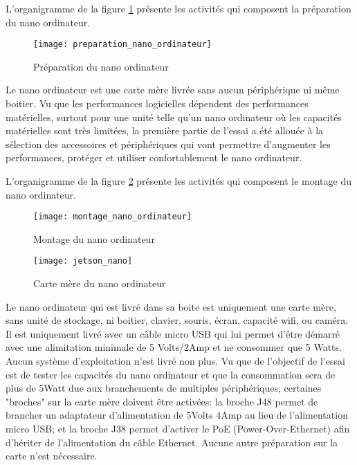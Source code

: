 ﻿\label{preparation_nano_ordinateur}
\par L'organigramme de la figure \ref{fig:preparation_nano_ordinateur} présente les activités qui composent la préparation du nano ordinateur. 
\begin{figure}[H]
    \centering
    \texttt{[image: preparation\_nano\_ordinateur]}
    \caption{Préparation du nano ordinateur}
    \label{fig:preparation_nano_ordinateur}
\end{figure}
\par Le nano ordinateur est une carte mère livrée sans aucun périphérique ni même boitier. Vu que les performances logicielles dépendent des performances matérielles, surtout pour une unité telle qu'un nano ordinateur où les capacités matérielles sont très limitées, la première partie de l'essai a été allouée à la sélection des accessoires et périphériques qui vont permettre d'augmenter les performances, protéger et utiliser confortablement le nano ordinateur. 
\label{montage_nano_ordinateur}
\par L'organigramme de la figure \ref{fig:montage_nano_ordinateur} présente les activités qui composent le montage du nano ordinateur. 
\begin{figure}[H]
    \centering
    \texttt{[image: montage\_nano\_ordinateur]}
    \caption{Montage du nano ordinateur}
    \label{fig:montage_nano_ordinateur}
\end{figure}
\begin{figure}[H]
    \centering
    \texttt{[image: jetson\_nano]}
    \caption{Carte mère du nano ordinateur}
    \label{fig:jetson_nano}
\end{figure}
\par Le nano ordinateur qui est livré dans sa boite est uniquement une carte mère, sans unité de stockage, ni boitier, clavier, souris, écran, capacité wifi, ou caméra. Il est uniquement livré avec un câble micro USB qui lui permet d'être démarré avec une alimitation minimale de 5 Volts/2Amp et ne consommer que 5 Watts. Aucun système d'exploitation n'est livré non plus. Vu que de l'objectif de l'essai est de tester les capacités du nano ordinateur et que la consommation sera de plus de 5Watt due aux branchements de multiples périphériques, certaines "broches" sur la carte mère doivent être activées:  la broche J48 permet de brancher un adaptateur d'alimentation de 5Volts 4Amp au lieu de l'alimentation micro USB; et la broche J38 permet d'activer le PoE (Power-Over-Ethernet) afin d'hériter de l'alimentation du câble Ethernet. Aucune autre préparation sur la carte n'est nécessaire.
